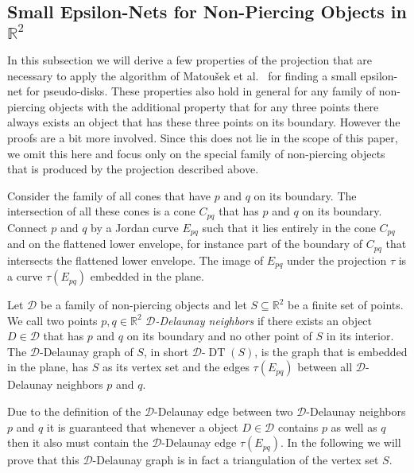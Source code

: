 \documentclass{stacs_proc}
\newcommand{\setR}{\mathbb{R}}
\newcommand{\D}{\mathcal{D}}
\DeclareMathOperator{\DT}{DT}
\begin{document}
\subsection{Small Epsilon-Nets for Non-Piercing Objects in $\setR^2$}

In this subsection we will derive a few properties of the projection
that are necessary to apply the algorithm of Matou\v{s}ek et
al.~\cite{MSW90} for finding a small epsilon-net for
pseudo-disks. These properties also hold in general for any family of
non-piercing objects with the additional property that for any three
points there always exists an object that has these three points on
its boundary. 
However the proofs are a bit more involved. 
Since this does not lie in the scope of
this paper, we omit this here and focus only on the special family of
non-piercing objects that is produced by the projection described
above. 


Consider the family of all cones that have $p$ and $q$ on its
boundary. The intersection of all these cones is a cone $C_{pq}$ that
has $p$ and $q$ on its boundary. Connect $p$ and $q$ by a Jordan curve
$E_{pq}$ such that it lies entirely in the cone $C_{pq}$ and on the
flattened lower envelope, for instance part of the boundary of
$C_{pq}$ that intersects the flattened lower envelope. The image of
$E_{pq}$ under the projection $\tau$ is a curve $\tau(E_{pq})$ embedded in
the plane. 


\begin{defi}
  Let $\D$ be a family of non-piercing objects and let $S\subseteq \setR^2$ be a
  finite set of points.  
  We call two points $p, q\in \setR^2$ \emph{$\D$-Delaunay
    neighbors} if there exists an object $D\in \D$ that has $p$ and $q$ on
  its boundary and no other point of $S$ in its interior. 
  The
  $\D$-Delaunay graph of $S$, in short $\D$-$\DT(S)$, is the graph that
  is embedded in the plane, has $S$ as its vertex set and the edges
  $\tau(E_{pq})$  
  between all $\D$-Delaunay neighbors $p$ and $q$. 
\end{defi}
Due to the definition of the $\D$-Delaunay edge between two
$\D$-Delaunay neighbors $p$ and $q$ it is guaranteed that whenever a
object $D\in \D$ contains $p$ as well as $q$ then it also must contain
the $\D$-Delaunay edge $\tau(E_{pq})$.  
In the following we will prove
that this $\D$-Delaunay graph is in fact a triangulation of the vertex
set $S$. 
\end{document}
